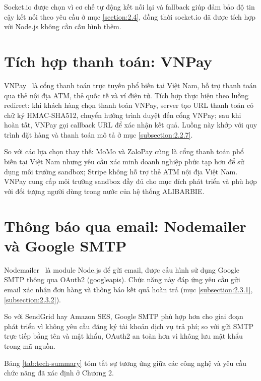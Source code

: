 \documentclass[../DoAn.tex]{subfiles}
\begin{document}
Socket.io được chọn vì cơ chế tự động kết nối lại và fallback giúp đảm bảo độ
tin cậy kết nối theo yêu cầu ở mục \ref{section:2.4}, đồng thời socket.io đã được  tích hợp 
với Node.js không cần cấu hình thêm.

\section{Tích hợp thanh toán: VNPay}
\label{section:3.7}

VNPay~\cite{vnpay} là cổng thanh toán trực tuyến phổ biến tại Việt Nam, hỗ trợ
thanh toán qua thẻ nội địa ATM, thẻ quốc tế và ví điện tử. Tích hợp thực hiện
theo luồng redirect: khi khách hàng chọn thanh toán VNPay, server tạo URL thanh
toán có chữ ký HMAC-SHA512, chuyển hướng trình duyệt đến cổng VNPay; sau khi
hoàn tất, VNPay gọi callback URL để xác nhận kết quả. Luồng này khớp với quy
trình đặt hàng và thanh toán mô tả ở mục \ref{subsection:2.2.7}.

So với các lựa chọn thay thế: MoMo và ZaloPay cũng là cổng thanh toán phổ biến
tại Việt Nam nhưng yêu cầu xác minh doanh nghiệp phức tạp hơn để sử dụng môi
trường sandbox; Stripe không hỗ trợ thẻ ATM nội địa Việt Nam. VNPay cung cấp môi
trường sandbox đầy đủ cho mục đích phát triển và phù hợp với đối tượng người dùng
trong nước của hệ thống ALIBARBIE.

\section{Thông báo qua email: Nodemailer và Google SMTP}
\label{section:3.8}

Nodemailer~\cite{nodemailer} là module Node.js để gửi email, được cấu hình sử dụng
Google SMTP thông qua OAuth2 (googleapis). Chức năng này đáp ứng yêu cầu gửi email
xác nhận đơn hàng và thông báo kết quả hoàn trả (mục \ref{subsection:2.3.1},
\ref{subsection:2.3.2}).

So với SendGrid hay Amazon SES, Google SMTP phù hợp hơn cho giai đoạn phát triển
vì không yêu cầu đăng ký tài khoản dịch vụ trả phí; so với gửi SMTP trực tiếp
bằng tên và mật khẩu, OAuth2 an toàn hơn vì không lưu mật khẩu trong mã nguồn.

Bảng \ref{tab:tech-summary} tóm tắt sự tương ứng giữa các công nghệ và yêu cầu
chức năng đã xác định ở Chương 2.
\end{document}

